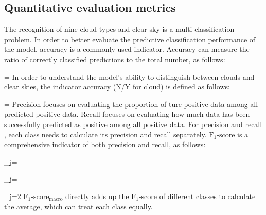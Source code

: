 \documentclass[review]{elsarticle}
\let\oldequation\equation
\let\oldendequation\endequation
\renewenvironment{equation}{\linenomathNonumbers\oldequation}{\oldendequation\endlinenomath}
\begin{document}
\subsection{Quantitative evaluation metrics}
The recognition of nine cloud types and clear sky is a multi classification problem. In order to better evaluate the predictive classification performance of the model, accuracy is a commonly used indicator. $\mathrm{Accuracy}$ can measure the ratio of correctly classified predictions to the total number, as follows:

\begin{equation}
    \label{eq:Accuracy}
     = 
\end{equation}
In order to understand the model's ability to distinguish between clouds and clear skies, the indicator accuracy (N/Y for cloud) is defined as follows:

\begin{equation}
    \label{eq:Accuracy_NY}
     = 
\end{equation}
$\mathrm{Precision}$ focuses on evaluating the proportion of ture positive data among all predicted positive data.
$\mathrm{Recall}$ focuses on evaluating how much data has been successfully predicted as positive among all positive data.
For $\mathrm{precision}$ and $\mathrm{recall}$, each class needs to calculate its precision and recall separately.
$\mathrm{F_{1}\mbox{-}score}$ is a comprehensive indicator of both $\mathrm{precision}$ and $\mathrm{recall}$, as follows:

\begin{equation}
    \label{eq:Recall_j}
     _{j}=
\end{equation}

\begin{equation}
    \label{eq:Precision_j}
     _{j}=
\end{equation}

\begin{equation}
    \label{eq:F1-score_j}
     _{j}=2
\end{equation}
$\mathrm{F_{1}\mbox{-}score_{macro}}$ directly adds up the $\mathrm{F_{1}\mbox{-}score}$ of different classes to calculate the average, which can treat each class equally.
\end{document}
